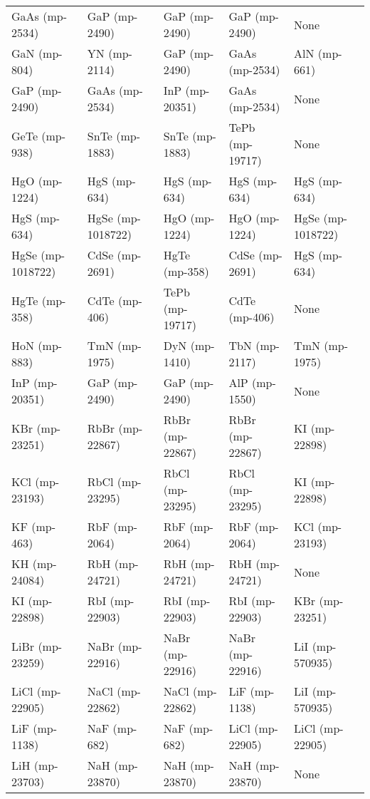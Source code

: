 \begin{longtable}{lllll}
   GaAs (mp-2534) &     GaP (mp-2490) &     GaP (mp-2490) &     GaP (mp-2490) &              None \\
     GaN (mp-804) &      YN (mp-2114) &     GaP (mp-2490) &    GaAs (mp-2534) &      AlN (mp-661) \\
    GaP (mp-2490) &    GaAs (mp-2534) &    InP (mp-20351) &    GaAs (mp-2534) &              None \\
    GeTe (mp-938) &    SnTe (mp-1883) &    SnTe (mp-1883) &   TePb (mp-19717) &              None \\
    HgO (mp-1224) &      HgS (mp-634) &      HgS (mp-634) &      HgS (mp-634) &      HgS (mp-634) \\
     HgS (mp-634) & HgSe (mp-1018722) &     HgO (mp-1224) &     HgO (mp-1224) & HgSe (mp-1018722) \\
HgSe (mp-1018722) &    CdSe (mp-2691) &     HgTe (mp-358) &    CdSe (mp-2691) &      HgS (mp-634) \\
    HgTe (mp-358) &     CdTe (mp-406) &   TePb (mp-19717) &     CdTe (mp-406) &              None \\
     HoN (mp-883) &     TmN (mp-1975) &     DyN (mp-1410) &     TbN (mp-2117) &     TmN (mp-1975) \\
   InP (mp-20351) &     GaP (mp-2490) &     GaP (mp-2490) &     AlP (mp-1550) &              None \\
   KBr (mp-23251) &   RbBr (mp-22867) &   RbBr (mp-22867) &   RbBr (mp-22867) &     KI (mp-22898) \\
   KCl (mp-23193) &   RbCl (mp-23295) &   RbCl (mp-23295) &   RbCl (mp-23295) &     KI (mp-22898) \\
      KF (mp-463) &     RbF (mp-2064) &     RbF (mp-2064) &     RbF (mp-2064) &    KCl (mp-23193) \\
    KH (mp-24084) &    RbH (mp-24721) &    RbH (mp-24721) &    RbH (mp-24721) &              None \\
    KI (mp-22898) &    RbI (mp-22903) &    RbI (mp-22903) &    RbI (mp-22903) &    KBr (mp-23251) \\
  LiBr (mp-23259) &   NaBr (mp-22916) &   NaBr (mp-22916) &   NaBr (mp-22916) &   LiI (mp-570935) \\
  LiCl (mp-22905) &   NaCl (mp-22862) &   NaCl (mp-22862) &     LiF (mp-1138) &   LiI (mp-570935) \\
    LiF (mp-1138) &      NaF (mp-682) &      NaF (mp-682) &   LiCl (mp-22905) &   LiCl (mp-22905) \\
   LiH (mp-23703) &    NaH (mp-23870) &    NaH (mp-23870) &    NaH (mp-23870) &              None \\

\end{longtable}
